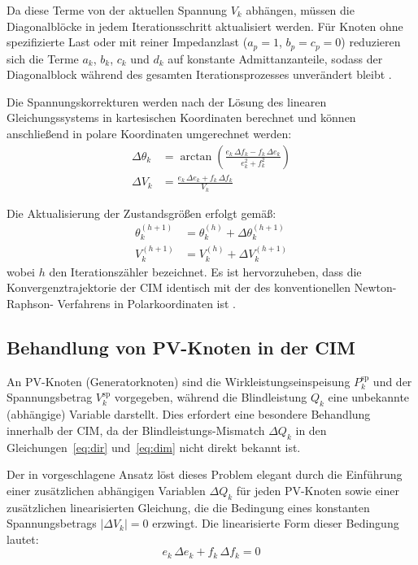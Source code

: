 Da diese Terme von der aktuellen Spannung $V_k$ abhängen, müssen die Diagonalblöcke 
in jedem Iterationsschritt aktualisiert werden. Für Knoten ohne spezifizierte Last 
oder mit reiner Impedanzlast ($a_p = 1$, $b_p = c_p = 0$) reduzieren sich die Terme 
$a_k$, $b_k$, $c_k$ und $d_k$ auf konstante Admittanzanteile, sodass der 
Diagonalblock während des gesamten Iterationsprozesses unverändert bleibt 
\cite{DaCosta1999}.

Die Spannungskorrekturen werden nach der Lösung des linearen Gleichungssystems in 
kartesischen Koordinaten berechnet und können anschließend in polare Koordinaten 
umgerechnet werden:
\begin{align}
	\Delta \theta_k &= \arctan\left(\frac{e_k\,\Delta f_k - f_k\,\Delta e_k}
	{e_k^2 + f_k^2}\right) \label{eq:dtheta}\\
	\Delta V_k &= \frac{e_k\,\Delta e_k + f_k\,\Delta f_k}{V_k} 
	\label{eq:dv_polar}
\end{align}

Die Aktualisierung der Zustandsgrößen erfolgt gemäß:
\begin{align}
	\theta_k^{(h+1)} &= \theta_k^{(h)} + \Delta \theta_k^{(h+1)} \label{eq:update_theta}\\
	V_k^{(h+1)} &= V_k^{(h)} + \Delta V_k^{(h+1)} \label{eq:update_v}
\end{align}
wobei $h$ den Iterationszähler bezeichnet. Es ist hervorzuheben, dass die 
Konvergenztrajektorie der CIM identisch mit der des konventionellen Newton-Raphson-
Verfahrens in Polarkoordinaten ist \cite{DaCosta1999}.

\subsection{Behandlung von PV-Knoten in der CIM}\label{subsec:cim_pv}

An PV-Knoten (Generatorknoten) sind die Wirkleistungseinspeisung $P_k^{\mathrm{sp}}$ 
und der Spannungsbetrag $V_k^{\mathrm{sp}}$ vorgegeben, während die Blindleistung 
$Q_k$ eine unbekannte (abhängige) Variable darstellt. Dies erfordert eine besondere 
Behandlung innerhalb der CIM, da der Blindleistungs-Mismatch $\Delta Q_k$ in den 
Gleichungen~\eqref{eq:dir} und~\eqref{eq:dim} nicht direkt bekannt ist.

Der in \cite{DaCosta1999} vorgeschlagene Ansatz löst dieses Problem elegant durch die 
Einführung einer zusätzlichen abhängigen Variablen $\Delta Q_k$ für jeden PV-Knoten 
sowie einer zusätzlichen linearisierten Gleichung, die die Bedingung eines konstanten 
Spannungsbetrags $|\Delta V_k| = 0$ erzwingt. Die linearisierte Form dieser Bedingung 
lautet:
\begin{equation}
	e_k\,\Delta e_k + f_k\,\Delta f_k = 0
	\label{eq:dv_constraint}
\end{equation}

